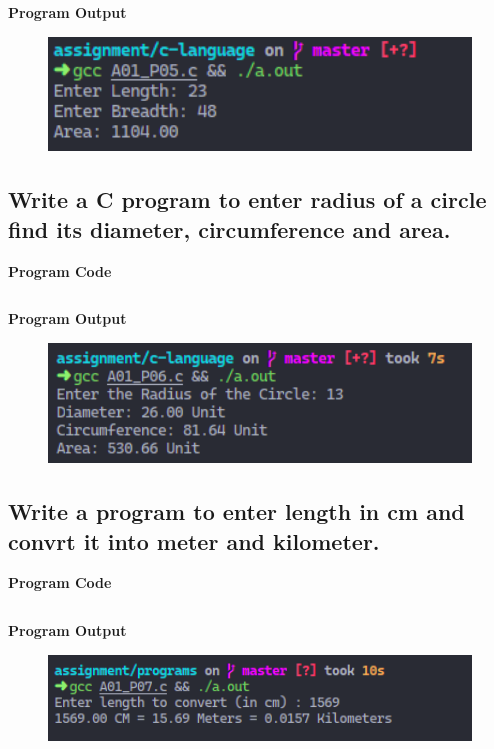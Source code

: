 \documentclass[a4paper, onecolumn]{article}
\begin{document}
\inputminted{C}{programs/A01_P05.c}

\textbf{Program Output}

\begin{figure}[h]
  \includegraphics[width=12cm]{A01_P05}
\end{figure}

\newpage



\subsection{Write a C program to enter radius of a circle find its diameter, circumference and area.}
\textbf{Program Code}

\inputminted{C}{programs/A01_P06.c}

\textbf{Program Output}

\begin{figure}[h]
  \includegraphics[width=12cm]{A01_P06}
\end{figure}

\newpage



\subsection{Write a program to enter length in cm and convrt it into meter and kilometer.}
\textbf{Program Code}

\inputminted{C}{programs/A01_P07.c}

\textbf{Program Output}

\begin{figure}[h]
  \includegraphics[width=12cm]{A01_P07}
\end{figure}
\end{document}
